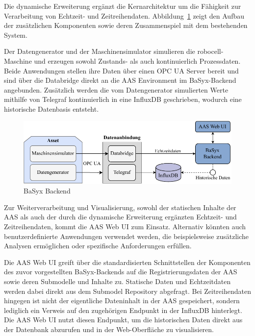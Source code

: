 Die dynamische Erweiterung ergänzt die Kernarchitektur um die Fähigkeit zur Verarbeitung von Echtzeit- und Zeitreihendaten. 
Abbildung~\ref{fig:DynamischeErweiterungArchitektur} zeigt den Aufbau der zusätzlichen Komponenten sowie deren Zusammenspiel mit dem bestehenden System.

Der Datengenerator und der Maschinensimulator simulieren die robocell-Maschine und erzeugen sowohl Zustands- als auch kontinuierlich Prozessdaten. 
Beide Anwendungen stellen ihre Daten über einen OPC UA Server bereit und sind über die Databridge direkt an die AAS Environment im BaSyx-Backend angebunden.
Zusätzlich werden die vom Datengenerator simulierten Werte mithilfe von Telegraf kontinuierlich in eine InfluxDB geschrieben, wodurch eine historische Datenbasis entsteht. 

\begin{figure}[htbp]
    \centering
        \includegraphics[width=1\textwidth]{Bilder/Ergebnisse/Systemarchitektur/DynamischeErwweiterung.pdf}
    \caption{BaSyx Backend}
    \label{fig:DynamischeErweiterungArchitektur}
\end{figure}

Zur Weiterverarbeitung und Visualisierung, sowohl der statischen Inhalte der AAS als auch der durch die dynamische Erweiterung ergänzten Echtzeit- und Zeitreihendaten, kommt die AAS Web UI zum Einsatz. 
Alternativ könnten auch benutzerdefinierte Anwendungen verwendet werden, die beispielsweise zusätzliche Analysen ermöglichen oder spezifische Anforderungen erfüllen.

Die AAS Web UI greift über die standardisierten Schnittstellen der Komponenten des zuvor vorgestellten BaSyx-Backends auf die Registrierungsdaten der AAS sowie deren Submodelle und Inhalte zu. 
Statische Daten und Echtzeitdaten werden dabei direkt aus dem Submodel Repository abgefragt. 
Bei Zeitreihendaten hingegen ist nicht der eigentliche Dateninhalt in der AAS gespeichert, sondern lediglich ein Verweis auf den zugehörigen Endpunkt in der InfluxDB hinterlegt. 
Die AAS Web UI nutzt diesen Endpunkt, um die historischen Daten direkt aus der Datenbank abzurufen und in der Web-Oberfläche zu visualisieren.

